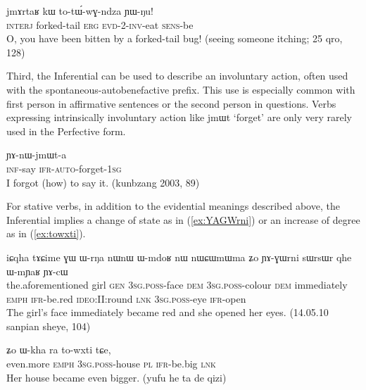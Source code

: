 \documentclass[oldfontcommands,oneside,a4paper,11pt]{article}
\newcommand{\ipa}[1]{{\phon \mbox{#1}}} %
\newcommand{\refb}[1]{(\ref{#1})}
\begin{document}
\begin{exe}
\ex \label{ex:totWwGndza}
\gll \ipa{wo}	\ipa{jmɤrtaʁ} 	\ipa{kɯ} 	\ipa{to-tɯ́-wɣ-ndza} 	\ipa{ɲɯ-ŋu!} \\
\textsc{interj} forked-tail \textsc{erg} \textsc{evd-2-inv}-eat \textsc{sens}-be\\
\glt O, you have been bitten by a forked-tail bug! (seeing someone itching; 25 qro, 128)
\end{exe}

Third, the Inferential can be used to describe an involuntary action, often used with the spontaneous-autobenefactive prefix. This use is especially common with first person in affirmative sentences or the second person in questions. Verbs expressing intrinsically involuntary action like \ipa{jmɯt} `forget' are only very rarely used in the Perfective form.

\begin{exe}
\ex 
\gll \ipa{kɤ-ti} \ipa{ɲɤ-nɯ-jmɯt-a} \\
\textsc{inf}-say  \textsc{ifr-auto}-forget-\textsc{1sg} \\
\glt I forgot (how) to say it. (kunbzang 2003, 89)
\end{exe}

For stative verbs, in addition to the evidential meanings described above, the Inferential implies a change of state as in \refb{ex:YAGWrni} or an increase of degree as in \refb{ex:towxti}.

\begin{exe}
\ex \label{ex:YAGWrni}
\gll 
\ipa{iɕqha} 	\ipa{tɤɕime} 	\ipa{ɣɯ} 	\ipa{ɯ-rŋa} 	\ipa{nɯnɯ} 	\ipa{ɯ-mdoʁ} 	\ipa{nɯ} 	\ipa{nɯɕɯmɯma} 	\ipa{ʑo} 	\ipa{ɲɤ-ɣɯrni} 	\ipa{sɯrsɯr} 	\ipa{qhe} 	\ipa{ɯ-mɲaʁ} 	\ipa{ɲɤ-cɯ}\\
the.aforementioned girl \textsc{gen} \textsc{3sg.poss}-face \textsc{dem} \textsc{3sg.poss}-colour \textsc{dem} immediately \textsc{emph} \textsc{ifr}-be.red \textsc{ideo}:II:round \textsc{lnk} \textsc{3sg.poss}-eye \textsc{ifr}-open \\
\glt The girl's face immediately became red and she opened her eyes. (14.05.10 sanpian sheye, 104)
\end{exe}

\begin{exe}
\ex \label{ex:towxti}
\gll \ipa{mɤʑɯ} 	\ipa{ʑo} 	\ipa{ɯ-kha} 	\ipa{ra} 	\ipa{to-wxti} 	\ipa{tɕe,} \\
even.more \textsc{emph} \textsc{3sg.poss}-house \textsc{pl} \textsc{ifr}-be.big \textsc{lnk} \\
\glt Her house became even bigger. (yufu he ta de qizi)
\end{exe}
\end{document}
